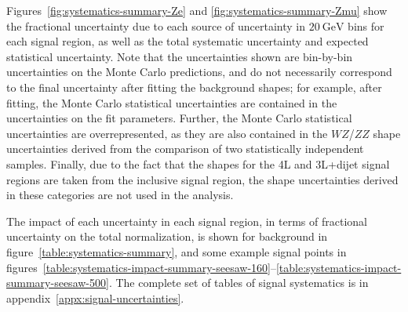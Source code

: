 Figures~\ref{fig:systematics-summary-Ze} and \ref{fig:systematics-summary-Zmu} show the fractional uncertainty due to each source of uncertainty in $20~\mbox{GeV}$ bins for each signal region, as well as the total systematic uncertainty and expected statistical uncertainty. Note that the uncertainties shown are bin-by-bin uncertainties on the Monte Carlo predictions, and do not necessarily correspond to the final uncertainty after fitting the background shapes; for example, after fitting, the Monte Carlo statistical uncertainties are contained in the uncertainties on the fit parameters. Further, the Monte Carlo statistical uncertainties are overrepresented, as they are also contained in the $WZ$/$ZZ$ shape uncertainties derived from the comparison of two statistically independent samples. Finally, due to the fact that the shapes for the 4L and 3L+dijet signal regions are taken from the inclusive signal region, the shape uncertainties derived in these categories are not used in the analysis.

The impact of each uncertainty in each signal region, in terms of fractional uncertainty on the total normalization, is shown for background in figure~\ref{table:systematics-summary}, and some example signal points in figures~\ref{table:systematics-impact-summary-seesaw-160}--\ref{table:systematics-impact-summary-seesaw-500}. The complete set of tables of signal systematics is in appendix~\ref{appx:signal-uncertainties}.


